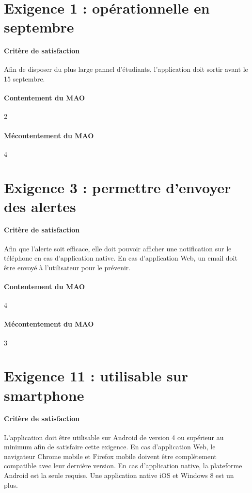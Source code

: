 \documentclass[a4paper, 12pt, french]{article}
\begin{document}
	\section{Exigence 1 : opérationnelle en septembre}

	\paragraph{Critère de satisfaction}
	Afin de disposer du plus large pannel d'étudiants, l'application doit sortir avant le 15 septembre.

	\paragraph{Contentement du MAO}
	2

	\paragraph{Mécontentement du MAO}
	4

	\section{Exigence 3 : permettre d'envoyer des alertes}

	\paragraph{Critère de satisfaction}
	Afin que l'alerte soit efficace, elle doit pouvoir afficher une notification sur le téléphone en cas d'application native. En cas d'application Web, un email doit être envoyé à l'utilisateur pour le prévenir.

	\paragraph{Contentement du MAO}
	4

	\paragraph{Mécontentement du MAO}
	3

	\section{Exigence 11 : utilisable sur smartphone}

	\paragraph{Critère de satisfaction}
	L'application doit être utilisable sur Android de version 4 ou supérieur au minimum afin de satisfaire cette exigence. En cas d'application Web, le navigateur Chrome mobile et Firefox mobile doivent être complètement compatible avec leur dernière version. En cas d'application native, la plateforme Android est la seule requise. Une application native iOS et Windows 8 est un plus.
\end{document}
